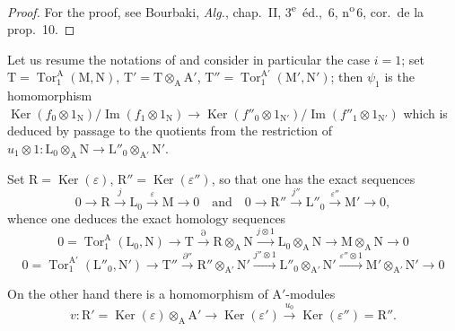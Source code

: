 \begin{proof}
For the proof, see Bourbaki, \emph{Alg.}, chap.~II, 3\textsuperscript{e}~\'{e}d., \textsection\,6, n\textsuperscript{o}\,6, cor.\ de la prop.~10.
\end{proof}

\begin{env}[11.2.3]
\label{IV.11.2.3}
Let us resume the notations of  and consider in particular the case $i=1$; set $\mathrm{T}=\operatorname{Tor}_1^\mathrm{A}(\mathrm{M},\mathrm{N})$, $\mathrm{T}'=\mathrm{T}\otimes_\mathrm{A}\mathrm{A}'$, $\mathrm{T}''=\operatorname{Tor}_1^{\mathrm{A}'}(\mathrm{M}',\mathrm{N}')$; then $\psi_1$ is the homomorphism $\operatorname{Ker}(f_0\otimes 1_\mathrm{N})/\operatorname{Im}(f_1\otimes 1_\mathrm{N})\to\operatorname{Ker}(f''_0\otimes 1_{\mathrm{N}'})/\operatorname{Im}(f''_1\otimes 1_{\mathrm{N}'})$ which is deduced by passage to the quotients from the restriction of $u_1\otimes 1:\mathrm{L}_0\otimes_\mathrm{A}\mathrm{N}\to\mathrm{L}''_0\otimes_{\mathrm{A}'}\mathrm{N}'$.

Set $\mathrm{R}=\operatorname{Ker}(\varepsilon)$, $\mathrm{R}''=\operatorname{Ker}(\varepsilon'')$, so that one has the exact sequences
\begin{equation}
  0\longrightarrow\mathrm{R}\xrightarrow{j}\mathrm{L}_0\xrightarrow{\varepsilon}\mathrm{M}\longrightarrow 0
  \quad\text{and}\quad
  0\longrightarrow\mathrm{R}''\xrightarrow{j''}\mathrm{L}''_0\xrightarrow{\varepsilon''}\mathrm{M}'\longrightarrow 0,
\end{equation}
whence one deduces the exact homology sequences
\begin{equation}
  0=\operatorname{Tor}_1^\mathrm{A}(\mathrm{L}_0,\mathrm{N})\to\mathrm{T}\xrightarrow{\partial}\mathrm{R}\otimes_\mathrm{A}\mathrm{N}\xrightarrow{j\otimes 1}\mathrm{L}_0\otimes_\mathrm{A}\mathrm{N}\to\mathrm{M}\otimes_\mathrm{A}\mathrm{N}\to 0
  \tag{11.2.3.1}
\end{equation}
\begin{equation}
  0=\operatorname{Tor}_1^{\mathrm{A}'}(\mathrm{L}''_0,\mathrm{N}')\to\mathrm{T}''\xrightarrow{\partial''}\mathrm{R}''\otimes_{\mathrm{A}'}\mathrm{N}'\xrightarrow{j''\otimes 1}\mathrm{L}''_0\otimes_{\mathrm{A}'}\mathrm{N}'\xrightarrow{\varepsilon''\otimes 1}\mathrm{M}'\otimes_{\mathrm{A}'}\mathrm{N}'\to 0
  \tag{11.2.3.2}
\end{equation}

On the other hand there is a homomorphism of $\mathrm{A}'$-modules
\[
  v:\mathrm{R}'=\operatorname{Ker}(\varepsilon)\otimes_\mathrm{A}\mathrm{A}'\longrightarrow\operatorname{Ker}(\varepsilon')\xrightarrow{u_0}\operatorname{Ker}(\varepsilon'')=\mathrm{R}''.
\]
\end{env}

